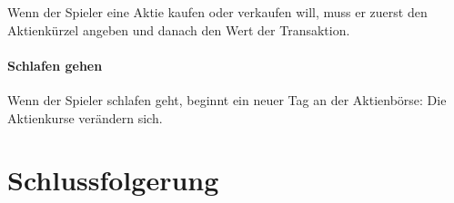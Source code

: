 \documentclass[paper=a4, fontsize=11pt]{article}
\numberwithin{equation}{section}		%
\numberwithin{figure}{section}			%
\numberwithin{table}{section}				%
\begin{document}
	Wenn der Spieler eine Aktie kaufen oder verkaufen will, muss er zuerst den Aktienkürzel angeben und danach den Wert der Transaktion.
	
	\paragraph{Schlafen gehen}
	
	Wenn der Spieler schlafen geht, beginnt ein neuer Tag an der Aktienbörse: Die Aktienkurse verändern sich. 
	
	\section{Schlussfolgerung}
	
	
	
\end{document}
